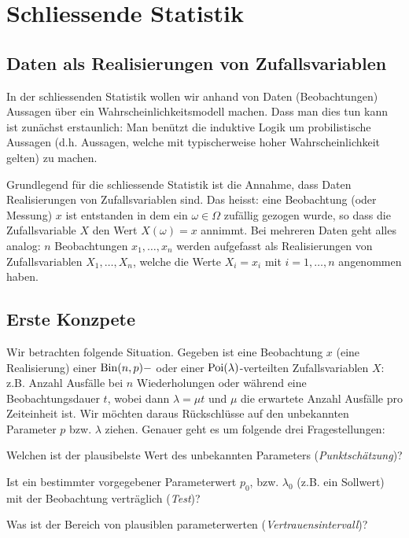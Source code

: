 \chapter{Schliessende Statistik}
\section{Daten als Realisierungen von Zufallsvariablen}
\label{sec8.1}
In der schliessenden Statistik wollen wir anhand von Daten (Beobachtungen) Aussagen über ein Wahrscheinlichkeitsmodell machen. Dass man dies tun kann ist zunächst erstaunlich: Man benützt die induktive Logik um probilistische Aussagen (d.h. Aussagen, welche mit typischerweise hoher Wahrscheinlichkeit gelten)  zu machen.

Grundlegend für die schliessende Statistik ist die Annahme, dass Daten Realisierungen von Zufallsvariablen sind. Das heisst: eine Beobachtung (oder \glqq Messung\grqq) $x$ ist entstanden in dem ein $\omega\in\Omega$ zufällig gezogen wurde, so dass die Zufallsvariable $X$ den Wert $X(\omega)=x$ annimmt. Bei mehreren Daten geht alles analog: $n$ Beobachtungen $x_1,\ldots,x_n$ werden aufgefasst als Realisierungen von Zufallsvariablen $X_1,\ldots,X_n$, welche die Werte $X_i=x_i$ mit $i=1,\ldots,n$  angenommen haben.
\section{Erste Konzpete}
Wir betrachten folgende Situation. Gegeben ist eine Beobachtung $x$ (eine Realisierung) einer $\operatorname{Bin}(n,p)-$ oder einer  $\operatorname{Poi}(\lambda)$-verteilten Zufallsvariablen $X$: z.B. Anzahl Ausfälle bei $n$ Wiederholungen oder während eine Beobachtungsdauer $t$, wobei dann $\lambda=\mu t$ und $\mu$ die erwartete Anzahl Ausfälle pro Zeiteinheit ist. Wir möchten daraus Rückschlüsse auf den unbekannten Parameter $p$ bzw. $\lambda$ ziehen. Genauer geht es um folgende drei Fragestellungen:
\begin{compactenum}[1.]
	\item Welchen ist der plausibelste Wert des unbekannten Parameters (\emph{Punktschätzung})?
	\item Ist ein bestimmter vorgegebener Parameterwert $p_0$, bzw. $\lambda_0$ (z.B. ein Sollwert) mit der Beobachtung verträglich (\emph{Test})?
	\item Was ist der Bereich von plausiblen parameterwerten (\emph{Vertrauensintervall})?
\end{compactenum}
